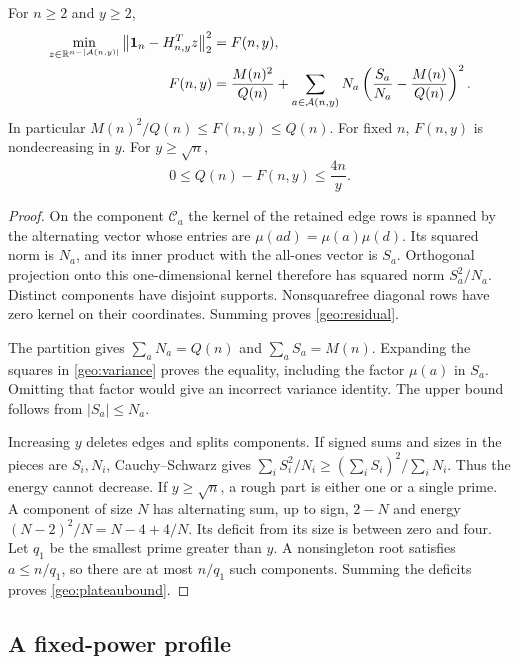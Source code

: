 \begin{proposition}\label{geo:projection}
For $n\ge2$ and $y\ge2$,
\begin{align}
 \min_{z\in\mathbb R^{n-|\mathcal A(n,y)|}}\left\lVert\mathbf{1}_n-H_{n,y}^Tz\right\rVert_2^2&=F(n,y),\label{geo:residual}\\
 F(n,y)&=\frac{M(n)^2}{Q(n)}+
  \sum_{a\in\mathcal A(n,y)}N_a
       \left(\frac{S_a}{N_a}-\frac{M(n)}{Q(n)}\right)^2.
       \label{geo:variance}
\end{align}
In particular $M(n)^2/Q(n)\le F(n,y)\le Q(n)$. For fixed $n$, $F(n,y)$ is nondecreasing in $y$. For $y\ge\sqrt n$,
\begin{equation}\label{geo:plateaubound}
 0\le Q(n)-F(n,y)\le\frac{4n}{y}.
\end{equation}
\end{proposition}
\begin{proof}
On the component $\mathcal C_a$ the kernel of the retained edge rows is spanned by the alternating vector whose entries are $\mu(ad)=\mu(a)\mu(d)$. Its squared norm is $N_a$, and its inner product with the all-ones vector is $S_a$. Orthogonal projection onto this one-dimensional kernel therefore has squared norm $S_a^2/N_a$. Distinct components have disjoint supports. Nonsquarefree diagonal rows have zero kernel on their coordinates. Summing proves \eqref{geo:residual}.

The partition gives $\sum_aN_a=Q(n)$ and $\sum_aS_a=M(n)$. Expanding the squares in \eqref{geo:variance} proves the equality, including the factor $\mu(a)$ in $S_a$. Omitting that factor would give an incorrect variance identity. The upper bound follows from $|S_a|\le N_a$.

Increasing $y$ deletes edges and splits components. If signed sums and sizes in the pieces are $S_i,N_i$, Cauchy--Schwarz gives $\sum_iS_i^2/N_i\ge(\sum_iS_i)^2/\sum_iN_i$. Thus the energy cannot decrease. If $y\ge\sqrt n$, a rough part is either one or a single prime. A component of size $N$ has alternating sum, up to sign, $2-N$ and energy $(N-2)^2/N=N-4+4/N$. Its deficit from its size is between zero and four. Let $q_1$ be the smallest prime greater than $y$. A nonsingleton root satisfies $a\le n/q_1$, so there are at most $n/q_1$ such components. Summing the deficits proves \eqref{geo:plateaubound}.
\end{proof}

\subsection{A fixed-power profile}

